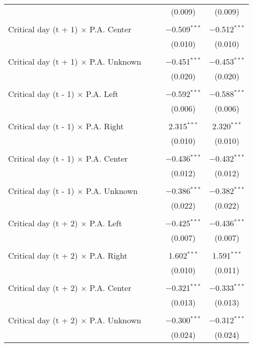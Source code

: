 \documentclass[
]{article}
\begin{document}
\begin{table}[!htbp]
{\begin{tabular}{@{\extracolsep{5pt}}lcccc}
  &  &  & (0.009) & (0.009) \\ 
  & & & & \\ 
 Critical day (t + 1) $\times$ P.A. Center &  &  & $-$0.509$^{***}$ & $-$0.512$^{***}$ \\ 
  &  &  & (0.010) & (0.010) \\ 
  & & & & \\ 
 Critical day (t + 1) $\times$ P.A. Unknown &  &  & $-$0.451$^{***}$ & $-$0.453$^{***}$ \\ 
  &  &  & (0.020) & (0.020) \\ 
  & & & & \\ 
 Critical day (t - 1) $\times$ P.A. Left &  &  & $-$0.592$^{***}$ & $-$0.588$^{***}$ \\ 
  &  &  & (0.006) & (0.006) \\ 
  & & & & \\ 
 Critical day (t - 1) $\times$ P.A. Right &  &  & 2.315$^{***}$ & 2.320$^{***}$ \\ 
  &  &  & (0.010) & (0.010) \\ 
  & & & & \\ 
 Critical day (t - 1) $\times$ P.A. Center &  &  & $-$0.436$^{***}$ & $-$0.432$^{***}$ \\ 
  &  &  & (0.012) & (0.012) \\ 
  & & & & \\ 
 Critical day (t - 1) $\times$ P.A. Unknown &  &  & $-$0.386$^{***}$ & $-$0.382$^{***}$ \\ 
  &  &  & (0.022) & (0.022) \\ 
  & & & & \\ 
 Critical day (t + 2) $\times$ P.A. Left &  &  & $-$0.425$^{***}$ & $-$0.436$^{***}$ \\ 
  &  &  & (0.007) & (0.007) \\ 
  & & & & \\ 
 Critical day (t + 2) $\times$ P.A. Right &  &  & 1.602$^{***}$ & 1.591$^{***}$ \\ 
  &  &  & (0.010) & (0.011) \\ 
  & & & & \\ 
 Critical day (t + 2) $\times$ P.A. Center &  &  & $-$0.321$^{***}$ & $-$0.333$^{***}$ \\ 
  &  &  & (0.013) & (0.013) \\ 
  & & & & \\ 
 Critical day (t + 2) $\times$ P.A. Unknown &  &  & $-$0.300$^{***}$ & $-$0.312$^{***}$ \\ 
  &  &  & (0.024) & (0.024) \\ 

\end{tabular}}
\end{table}
\end{document}
